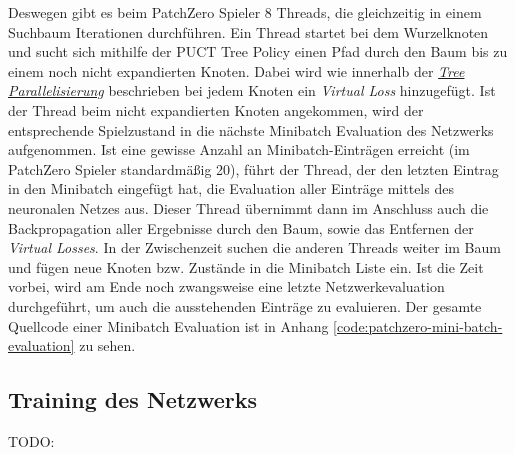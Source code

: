 Deswegen gibt es beim PatchZero Spieler 8 Threads, die gleichzeitig in einem Suchbaum Iterationen durchführen. Ein Thread startet bei dem Wurzelknoten und sucht sich mithilfe der PUCT Tree Policy einen Pfad durch den Baum bis zu einem noch nicht expandierten Knoten. Dabei wird wie innerhalb der \hyperref[text:tree-parallelization]{\emph{Tree Parallelisierung}} beschrieben bei jedem Knoten ein \emph{Virtual Loss} hinzugefügt. Ist der Thread beim nicht expandierten Knoten angekommen, wird der entsprechende Spielzustand in die nächste Minibatch Evaluation des Netzwerks aufgenommen. Ist eine gewisse Anzahl an Minibatch-Einträgen erreicht (im PatchZero Spieler standardmäßig 20), führt der Thread, der den letzten Eintrag in den Minibatch eingefügt hat, die Evaluation aller Einträge mittels des neuronalen Netzes aus. Dieser Thread übernimmt dann im Anschluss auch die Backpropagation aller Ergebnisse durch den Baum, sowie das Entfernen der \emph{Virtual Losses}. In der Zwischenzeit suchen die anderen Threads weiter im Baum und fügen neue Knoten bzw. Zustände in die Minibatch Liste ein. Ist die Zeit vorbei, wird am Ende noch zwangsweise eine letzte Netzwerkevaluation durchgeführt, um auch die ausstehenden Einträge zu evaluieren. Der gesamte Quellcode einer Minibatch Evaluation ist in Anhang \ref{code:patchzero-mini-batch-evaluation} zu sehen.

\subsection{Training des Netzwerks}

TODO: